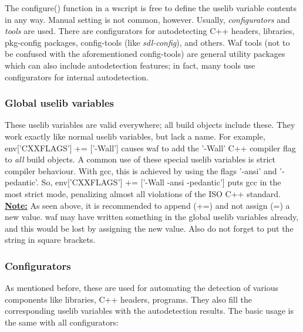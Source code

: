 \documentclass[a4,10pt]{article}
\begin{document}
The configure() function in a wscript is free to define the uselib variable contents in any way. Manual setting is not common, however. Usually, \emph{configurators} and \emph{tools} are used. There are configurators for autodetecting C++ headers, libraries, pkg-config packages, config-tools (like \emph{sdl-config}), and others. Waf tools (not to be confused with the aforementioned config-tools) are general utility packages which can also include autodetection features; in fact, many tools use configurators for internal autodetection.

\subsubsection{Global uselib variables}
These uselib variables are valid everywhere; all build objects include these. They work exactly like normal uselib variables, but lack a name. For example, env['CXXFLAGS'] += ['-Wall'] causes waf to add the '-Wall' C++ compiler flag to \emph{all} build objects. A common use of these special uselib variables is strict compiler behaviour. With gcc, this is achieved by using the flags '-ansi' and '-pedantic'. So, env['CXXFLAGS'] += ['-Wall -ansi -pedantic'] puts gcc in the most strict mode, penalizing almost all violations of the ISO C++ standard.\\

\textbf{\underline{Note:}} As seen above, it is recommended to append (+=) and not assign (=) a new value. waf may have written something in the global uselib variables already, and this would be lost by assigning the new value. Also do not forget to put the string in square brackets.

\subsubsection{Configurators}
As mentioned before, these are used for automating the detection of various components like libraries, C++ headers, programs. They also fill the corresponding uselib variables with the autodetection results. The basic usage is the same with all configurators:
\end{document}
